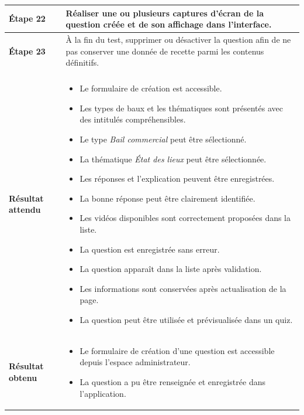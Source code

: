 \begin{longtable}{
    |>{\raggedright\arraybackslash}p{}
    |>{\raggedright\arraybackslash}p{}|
}
\textbf{Étape 22}
&
Réaliser une ou plusieurs captures d'écran de la question créée et de son
affichage dans l'interface.
\\
\hline

\textbf{Étape 23}
&
À la fin du test, supprimer ou désactiver la question afin de ne pas
conserver une donnée de recette parmi les contenus définitifs.
\\
\hline


\rowcolor{orange!15}
\multicolumn{2}{|c|}{
    \textbf{Résultats du test}
}
\\
\hline

\textbf{Résultat attendu}
&
\begin{itemize}[leftmargin=*,nosep]
    \item Le formulaire de création est accessible.
    \item Les types de baux et les thématiques sont présentés avec des
    intitulés compréhensibles.
    \item Le type \textit{Bail commercial} peut être sélectionné.
    \item La thématique \textit{État des lieux} peut être sélectionnée.
    \item Les réponses et l'explication peuvent être enregistrées.
    \item La bonne réponse peut être clairement identifiée.
    \item Les vidéos disponibles sont correctement proposées dans la liste.
    \item La question est enregistrée sans erreur.
    \item La question apparaît dans la liste après validation.
    \item Les informations sont conservées après actualisation de la page.
    \item La question peut être utilisée et prévisualisée dans un quiz.
\end{itemize}
\\
\hline

\textbf{Résultat obtenu}
&
\begin{itemize}[leftmargin=*,nosep]
    \item Le formulaire de création d'une question est accessible depuis
    l'espace administrateur.

    \item La question a pu être renseignée et enregistrée dans
    l'application.


\end{itemize}
\end{longtable}
